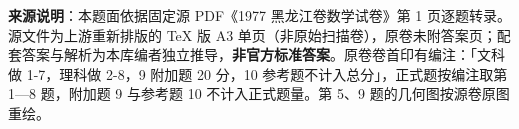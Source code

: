 


\begin{gktip}
\textbf{来源说明}：本题面依据固定源 PDF《1977 黑龙江卷数学试卷》第 1 页逐题转录。源文件为上游重新排版的 TeX 版 A3 单页（非原始扫描卷），原卷未附答案页；配套答案与解析为本库编者独立推导，\textbf{非官方标准答案}。原卷卷首印有编注：「文科做 1-7，理科做 2-8，9 附加题 20 分，10 参考题不计入总分」，正式题按编注取第 1—8 题，附加题 9 与参考题 10 不计入正式题量。第 5、9 题的几何图按源卷原图重绘。
\end{gktip}

\par\medskip

